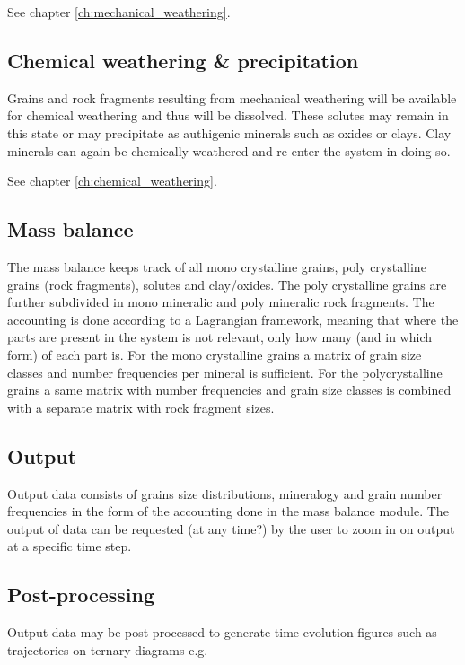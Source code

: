     See chapter \ref{ch:mechanical_weathering}. %

    \subsection{Chemical weathering \& precipitation}
    Grains and rock fragments resulting from mechanical weathering will be available for chemical weathering and thus will be dissolved. %
    These solutes may remain in this state or may precipitate as authigenic minerals such as oxides or clays. %
    Clay minerals can again be chemically weathered and re-enter the system in doing so. %

    See chapter \ref{ch:chemical_weathering}. %

    \subsection{Mass balance}
    The mass balance keeps track of all mono crystalline grains, poly crystalline grains (rock fragments), solutes and clay/oxides. %
    The poly crystalline grains are further subdivided in mono mineralic and poly mineralic rock fragments. %
    The accounting is done according to a Lagrangian framework, meaning that where the parts are present in the system is not relevant, only how many (and in which form) of each part is. %
    For the mono crystalline grains a matrix of grain size classes and number frequencies per mineral is sufficient. %
    For the polycrystalline grains a same matrix with number frequencies and grain size classes is combined with a separate matrix with rock fragment sizes. %

    \subsection{Output}
    Output data consists of grains size distributions, mineralogy and grain number frequencies in the form of the accounting done in the mass balance module. %
    The output of data can be requested (at any time?) by the user to zoom in on output at a specific time step. %

    \subsection{Post-processing}
    Output data may be post-processed to generate time-evolution figures such as trajectories on ternary diagrams e.g. %


